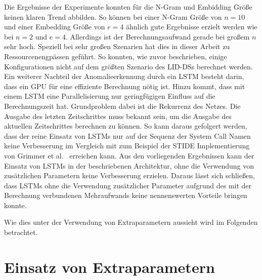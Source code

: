 Die Ergebnisse der Experimente konnten für die N-Gram und Embidding Größe keinen klaren Trend abbilden.
So können bei einer N-Gram Größe von $n=10$ und einer Embedding Größe von $e=4$ ähnlich gute Ergebnisse erzielt werden wie bei $n=2$ und $e=4$.
Allerdings ist der Berechnungsaufwand gerade bei großem $n$ sehr hoch.
Speziell bei sehr großen Szenarien hat dies in dieser Arbeit zu Ressourcenengpässen geführt.
So konnten, wie zuvor beschrieben, einige Konfigurationen nicht auf dem größten Szenario des \acp{LID-DS} berechnet werden.
Ein weiterer Nachteil der Anomalieerkennung durch ein \ac{LSTM} besteht darin, dass ein GPU für eine effiziente Berechnung nötig ist.
Hinzu kommt, dass mit einem \ac{LSTM} eine Parallelisierung nur geringfügigen Einfluss auf die Berechnungszeit hat.
Grundproblem dabei ist die Rekurrenz des Netzes. 
Die Ausgabe des letzten Zeitschrittes muss bekannt sein, um die Ausgabe des aktuellen Zeitschrittes berechnen zu können.
So kann daraus gefolgert werden, dass der reine Einsatz von \acp{LSTM} nur auf der Sequenz der System Call Namen keine Verbesserung im Vergleich mit zum Beispiel der \ac{STIDE} Implementierung von Grimmer et al.~\cite{IDSTHREADGRIMMER2021} erreichen kann.
Aus den vorliegenden Ergebnissen kann der Einsatz von \acp{LSTM} in der beschriebenen Architektur, ohne die Verwendung von zusätzlichen Parametern keine Verbesserung erzielen.
Daraus lässt sich schließen, dass \acp{LSTM} ohne die Verwendung zusätzlicher Parameter aufgrund des mit der Berechnung verbundenen Mehraufwands keine nennenswerten Vorteile bringen konnte.

Wie dies unter der Verwendung von Extraparametern aussieht wird im Folgenden betrachtet.

\section{Einsatz von Extraparametern}\label{sec:folgerungen_extra}

